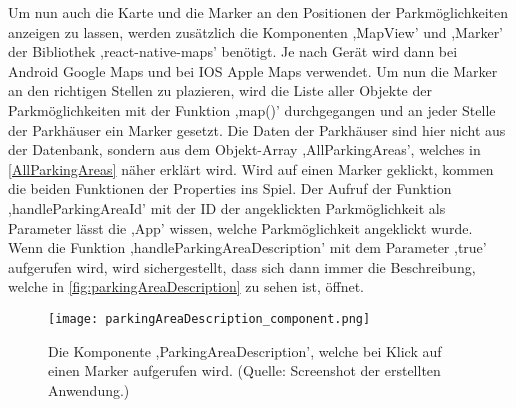 Um nun auch die Karte und die Marker an den Positionen der Parkmöglichkeiten anzeigen zu lassen, werden zusätzlich die Komponenten ,MapView' und ,Marker' der Bibliothek ,react-native-maps' benötigt. Je nach Gerät wird dann bei Android Google Maps und bei IOS Apple Maps verwendet. Um nun die Marker an den richtigen Stellen zu plazieren, wird die Liste aller Objekte der Parkmöglichkeiten mit der Funktion ,map()' durchgegangen und an jeder Stelle der Parkhäuser ein Marker gesetzt. Die Daten der Parkhäuser sind hier nicht aus der Datenbank, sondern aus dem Objekt-Array ,AllParkingAreas', welches in \autoref{AllParkingAreas} näher erklärt wird. Wird auf einen Marker geklickt, kommen die beiden Funktionen der Properties ins Spiel. Der Aufruf der Funktion ,handleParkingAreaId' mit der ID der angeklickten Parkmöglichkeit als Parameter lässt die ,App' wissen, welche Parkmöglichkeit angeklickt wurde. Wenn die Funktion ,handleParkingAreaDescription' mit dem Parameter ,true' aufgerufen wird, wird sichergestellt, dass sich dann immer die Beschreibung, welche in \autoref{fig:parkingAreaDescription} zu sehen ist, öffnet.

\begin{figure}[h!]
	\centering
	\texttt{[image: parkingAreaDescription\_component.png]}
	\caption[Die Komponente ,ParkingAreaDescription', welche bei Klick auf einen Marker aufgerufen wird.]
	{Die Komponente ,ParkingAreaDescription', welche bei Klick auf einen Marker aufgerufen wird. (Quelle: Screenshot der erstellten Anwendung.)}
	\label{fig:parkingAreaDescription}
\end{figure}

